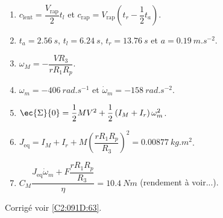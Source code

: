 \else
\ifcolle
\else
\footnotesize
\begin{enumerate}
 \item $c_{\text{lent}}=\dfrac{V_{\text{rap}}}{2}t_l$ et $c_{\text{rap}}=V_{\text{rap}}\left(t_r - \dfrac{1}{2}t_a\right)$.
 \item $t_a=\SI{2,56}{s}$, $t_l=\SI{6,24}{s}$, $t_r=\SI{13,76}{s}$ et $a =\SI{0,19}{m.s^{-2}}$. 
 \item $\omega_M = - \dfrac{VR_3}{rR_1R_p}$.
 \item $\omega_m = -\SI{406}{rad.s^{-1}}$ et  $\dot{\omega}_m= -\SI{158}{rad.s^{-2}}$.
 \item $\ec{\Sigma}{0} = \dfrac{1}{2}MV^2 + \dfrac{1}{2}\left( I_M + I_r \right)\omega_m^2$.
 \item $J_{\text{eq}} = I_M + I_r + M \left( \dfrac{rR_1 R_p}{R_3}\right)^2 = \SI{0,00877}{kg.m^2}$.
 \item $C_M \dfrac{J_{\text{eq}} \dot{\omega}_m + F \dfrac{rR_1R_p}{R_3}}{\eta} = \SI{10,4}{Nm}$ (rendement à voir...).
\end{enumerate}
\fi

\normalsize

\begin{flushright}
\footnotesize{Corrigé  voir \ref{C2:091D:63}.}
\end{flushright}%
\fi